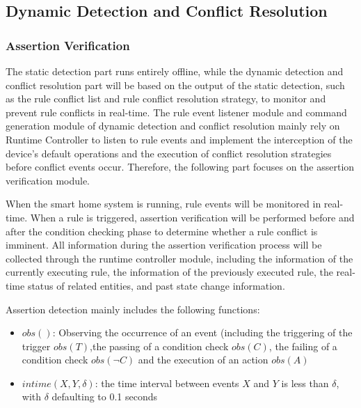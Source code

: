 \subsection{Dynamic Detection and Conflict Resolution}
\subsubsection{Assertion Verification}
The static detection part runs entirely offline, while the dynamic detection and conflict resolution part will be based on the output of the static detection, such as the rule conflict list and rule conflict resolution strategy, to monitor and prevent rule conflicts in real-time. The rule event listener module and command generation module of dynamic detection and conflict resolution mainly rely on Runtime Controller to listen to rule events and implement the interception of the device's default operations and the execution of conflict resolution strategies before conflict events occur. Therefore, the following part focuses on the assertion verification module.

When the smart home system is running, rule events will be monitored in real-time. When a rule is triggered, assertion verification will be performed before and after the condition checking phase to determine whether a rule conflict is imminent. All information during the assertion verification process will be collected through the runtime controller module, including the information of the currently executing rule, the information of the previously executed rule, the real-time status of related entities, and past state change information.

Assertion detection mainly includes the following functions:

\begin{itemize}
	\item $obs()$: Observing the occurrence of an event (including the triggering of the trigger $obs(T)$,the passing of a condition check $obs(C)$, the failing of a condition check $obs(\neg C)$ and the execution of an action $obs(A)$
	\item $intime(X,Y,\delta)$: the time interval between events $X$ and $Y$ is less than $\delta$, with $\delta$ defaulting to 0.1 seconds
\end{itemize}

